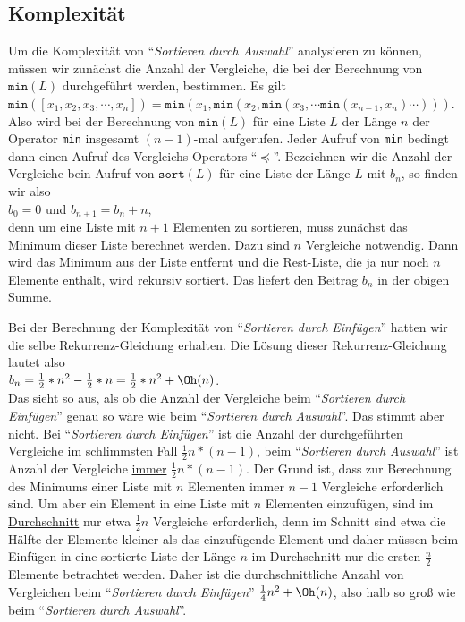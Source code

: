 \subsection{Komplexit\"at}
Um die Komplexit\"at von ``\emph{Sortieren durch Auswahl}'' analysieren zu k\"onnen, m\"ussen
wir zun\"achst die Anzahl der Vergleiche, die bei der Berechnung von $\mathtt{min}(L)$
durchgef\"uhrt werden, bestimmen.  Es gilt \\[0.1cm]
\hspace*{1.3cm} 
$\mathtt{min}([x_1,x_2,x_3,\cdots,x_n]) = \mathtt{min}(x_1, \mathtt{min}(x_2, \mathtt{min}(x_3, \cdots \mathtt{min}(x_{n-1},x_n) \cdots )))$. 
\\[0.1cm]
Also wird bei der Berechnung von $\texttt{min}(L)$ f\"ur eine Liste $L$ der L\"ange $n$ der Operator
\texttt{min} insgesamt $(n-1)$-mal aufgerufen.  Jeder Aufruf von \texttt{min} bedingt dann
einen Aufruf des Vergleichs-Operators ``$\preceq$''.
Bezeichnen wir die Anzahl der Vergleiche bein Aufruf von $\texttt{sort}(L)$ f\"ur eine
Liste der L\"ange $L$ mit $b_n$, so finden wir also \\[0.1cm]
\hspace*{1.3cm} $b_0 = 0$ \quad und \quad $b_{n+1} = b_n + n$, \hspace*{\fill}\\[0.1cm]
denn um eine Liste mit $n+1$ Elementen zu sortieren, muss zun\"achst das Minimum dieser
Liste berechnet werden.  Dazu sind $n$ Vergleiche notwendig.  Dann wird das Minimum aus
der Liste entfernt und die Rest-Liste, die ja nur noch $n$ Elemente enth\"alt, wird rekursiv
sortiert.  Das liefert den Beitrag $b_n$ in der obigen Summe.

Bei der Berechnung der Komplexit\"at von ``\emph{Sortieren durch Einf\"ugen}'' hatten wir die
selbe Rekurrenz-Gleichung erhalten.  Die L\"osung dieser Rekurrenz-Gleichung lautet also \\[0.1cm]
\hspace*{1.3cm} $b_n = \frac{1}{2} * n^2 - \frac{1}{2}* n = \frac{1}{2} * n^2 + \Oh(n)$. \\[0.1cm]
Das sieht so aus, als ob die Anzahl der Vergleiche beim ``\emph{Sortieren durch
  Einf\"ugen}'' genau so w\"are wie beim ``\emph{Sortieren durch Auswahl}''.  Das stimmt aber
nicht.  Bei ``\emph{Sortieren durch Einf\"ugen}'' ist die Anzahl der durchgef\"uhrten
Vergleiche im schlimmsten Fall $\frac{1}{2}n*(n-1)$, beim ``\emph{Sortieren durch
  Auswahl}'' ist Anzahl der Vergleiche \underline{immer} $\frac{1}{2}n*(n-1)$.  Der Grund
ist, dass zur Berechnung des Minimums einer Liste mit $n$ Elementen immer $n-1$ Vergleiche
erforderlich sind.  Um aber ein Element in eine Liste mit $n$ Elementen einzuf\"ugen, sind
im \underline{Durchschnitt} nur etwa $\frac{1}{2}n$ Vergleiche erforderlich, denn im Schnitt sind etwa
die H\"alfte der Elemente kleiner als das einzuf\"ugende Element und daher m\"ussen beim Einf\"ugen
in eine sortierte Liste der L\"ange $n$ im Durchschnitt nur die ersten $\frac{n}{2}$
Elemente betrachtet werden.  Daher ist die durchschnittliche Anzahl von Vergleichen beim
``\emph{Sortieren durch Einf\"ugen}'' $\frac{1}{4}n^2 + \Oh(n)$, also halb so gro\ss{} wie beim
``\emph{Sortieren durch Auswahl}''.


